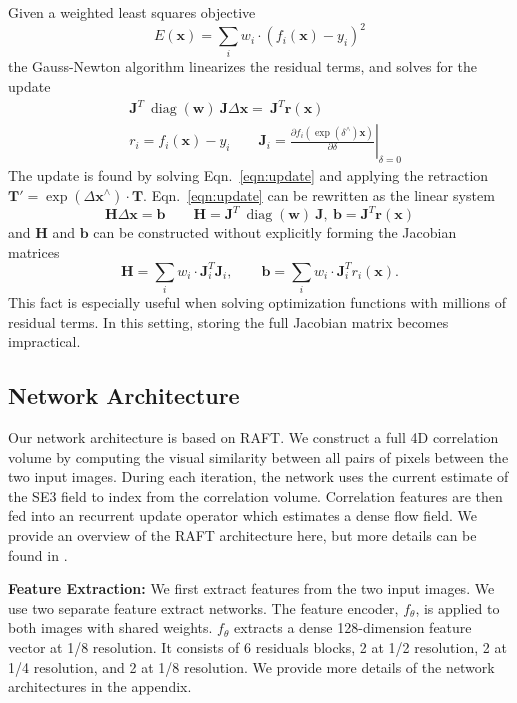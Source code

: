 \documentclass[final]{cvpr}
\DeclareMathOperator{\diag}{diag}
\begin{document}
Given a weighted least squares objective
\begin{equation}
    E(\mathbf{x}) = \sum_i w_i \cdot (f_i(\mathbf{x}) - y_i)^2
\end{equation}
the Gauss-Newton algorithm linearizes the residual terms, and solves for the update
\begin{align}
    &\mathbf{J}^T \ \diag(\mathbf{w}) \ \mathbf{J} \Delta \mathbf{x} = \ \mathbf{J}^T \mathbf{r}(\mathbf{x}) \\
    &r_i = f_i(\mathbf{x}) - y_i \qquad \mathbf{J}_i = \left. \frac{\partial f_i(\exp(\delta^\wedge) \mathbf{x})}{\partial \delta} \right|_{\delta=0} 
    \label{eqn:update}
\end{align}
The update is found by solving Eqn.~\ref{eqn:update} and applying the retraction $\mathbf{T}' = \exp(\Delta \mathbf{x}^\wedge) \cdot \mathbf{T}$. Eqn.~\ref{eqn:update} can be rewritten as the linear system
\begin{equation}
    \mathbf{H} \Delta \mathbf{x} = \mathbf{b} \qquad 
    \mathbf{H} = \mathbf{J}^T \ \diag(\mathbf{w}) \ \mathbf{J}, \ 
    \mathbf{b} = \mathbf{J}^T \mathbf{r}(\mathbf{x})
\end{equation}
and $\mathbf{H}$ and $\mathbf{b}$ can be constructed without explicitly forming the Jacobian matrices
\begin{equation}
    \mathbf{H} = \sum_i w_i \cdot \mathbf{J}_i^T \mathbf{J}_i, \qquad \mathbf{b} = \sum_i w_i \cdot  \mathbf{J}_i^T r_i(\mathbf{x}).
    \label{eqn:inplace}
\end{equation}
This fact is especially useful when solving optimization functions with millions of residual terms. In this setting, storing the full Jacobian matrix becomes impractical.

\subsection{Network Architecture}
Our network architecture is based on RAFT\cite{teed2020raft}. We construct a full 4D correlation volume by computing the visual similarity between all pairs of pixels between the two input images. During each iteration, the network uses the current estimate of the SE3 field to index from the correlation volume. Correlation features are then fed into an recurrent update operator which estimates a dense flow field. We provide an overview of the RAFT architecture here, but more details can be found in \cite{teed2020raft}.

\vspace{1mm} \noindent \textbf{Feature Extraction:}
We first extract features from the two input images. We use two separate feature extract networks. The feature encoder, $f_\theta$, is applied to both images with shared weights. $f_\theta$ extracts a dense 128-dimension feature vector at 1/8 resolution. It consists of 6 residuals blocks, 2 at 1/2 resolution, 2 at 1/4 resolution, and 2 at 1/8 resolution. We provide more details of the network architectures in the appendix.
\end{document}
